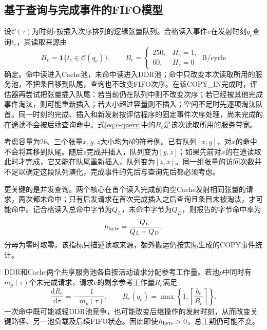 \subsection{基于查询与完成事件的FIFO模型}
设$\mathcal C(\tau)$为时刻$\tau$按插入次序排列的逻辑张量队列。合格读入事件$e$在发射时刻$q_e$查询$t_e$，其读取来源由
\begin{equation}
H_e=\mathbf 1\{t_e\in\mathcal C(q_e)\},\qquad
B_e=\begin{cases}250,&H_e=1,\\60,&H_e=0\end{cases}\ \mathrm{B/cycle}
\label{eq:c-query}
\end{equation}
确定。命中读进入Cache池，未命中读进入DDR池；命中只改变本次读取所用的服务池，不把条目移到队尾，查询也不改变FIFO次序。在该COPY\_IN完成时，评估器再尝试把张量插入队尾：若当前仍在队列中则不改变次序；若已经被其他完成事件淘汰，则可能重新插入；若大小超过容量则不插入；空间不足时先逐项淘汰队首。同一时刻的完成、插入和新发射按评估程序的固定事件次序处理，尚未完成的在途读不会被后续查询命中。式\eqref{eq:c-query}中的$B_e$是该次读取所用的服务带宽。

考虑容量为$2b$、三个张量$x,y,z$大小均为$b$的符号例。已有队列$[x,y]$，对$x$的命中不会将其移到队尾。随后$z$完成并插入，队列变为$[y,z]$；如果先前对$x$的在途读取此时才完成，它又能在队尾重新插入，队列变为$[z,x]$。同一组张量的访问次数并不足以确定这段队列演化，完成事件的先后与查询先后都必须考虑。

更关键的是并发查询。两个核心在首个读入完成前向空Cache发射相同张量的请求，两次都未命中；只有后发请求在首次完成插入之后查询且条目未被淘汰，才可能命中。记合格读入总命中字节为$Q_L$，未命中字节为$Q_D$，则报告的字节命中率为
\begin{equation}
h_{\rm byte}=\frac{Q_L}{Q_L+Q_D}.
\label{eq:hit-rate}
\end{equation}
分母为零时取零。该指标只描述读取来源，额外搬运仍按实际生成的COPY事件统计。

DDR和Cache两个共享服务池各自按活动请求分配参考工作量。若池$p$中同时有$m_p(\tau)$个未完成请求，请求$e$的剩余参考工作量$R_e$满足
\begin{equation}
\frac{\mathrm dR_e}{\mathrm d\tau}=-\frac{1}{m_p(\tau)},\qquad
R_e(q_e)=\max\left\{1,\left\lceil\frac{b_e}{B_e}\right\rceil\right\}.
\label{eq:c-service}
\end{equation}
一次命中既可能减轻DDR池竞争，也可能改变后继操作的发射时刻，从而改变关键路径、另一池负载及后续FIFO状态。因此即使$h_{\rm byte}>0$，总工期仍可能不变。

